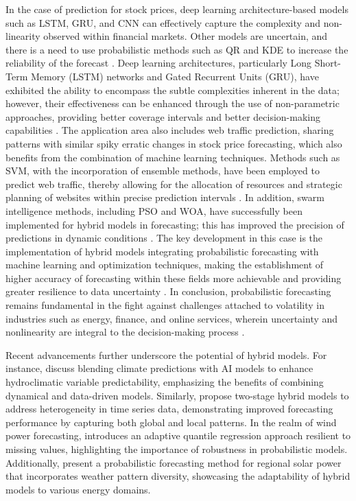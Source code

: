 In the case of prediction for stock prices, deep learning architecture-based models such as LSTM, GRU, and CNN can effectively capture the complexity and non-linearity observed within financial markets. Other models are uncertain, and there is a need to use probabilistic methods such as QR and KDE to increase the reliability of the forecast \cite{4, 9}. Deep learning architectures, particularly Long Short-Term Memory (LSTM) networks and Gated Recurrent Units (GRU), have exhibited the ability to encompass the subtle complexities inherent in the data; however, their effectiveness can be enhanced through the use of non-parametric approaches, providing better coverage intervals and better decision-making capabilities \cite{8, 3}. The application area also includes web traffic prediction, sharing patterns with similar spiky erratic changes in stock price forecasting, which also benefits from the combination of machine learning techniques. Methods such as SVM, with the incorporation of ensemble methods, have been employed to predict web traffic, thereby allowing for the allocation of resources and strategic planning of websites within precise prediction intervals \cite{5, 7}. In addition, swarm intelligence methods, including PSO and WOA, have successfully been implemented for hybrid models in forecasting; this has improved the precision of predictions in dynamic conditions \cite{9}. The key development in this case is the implementation of hybrid models integrating probabilistic forecasting with machine learning and optimization techniques, making the establishment of higher accuracy of forecasting within these fields more achievable and providing greater resilience to data uncertainty \cite{1, 6}. In conclusion, probabilistic forecasting remains fundamental in the fight against challenges attached to volatility in industries such as energy, finance, and online services, wherein uncertainty and nonlinearity are integral to the decision-making process \cite{2, 10, 9}.

Recent advancements further underscore the potential of hybrid models. For instance, \cite{14} discuss blending climate predictions with AI models to enhance hydroclimatic variable predictability, emphasizing the benefits of combining dynamical and data-driven models. Similarly, \cite{15} propose two-stage hybrid models to address heterogeneity in time series data, demonstrating improved forecasting performance by capturing both global and local patterns. In the realm of wind power forecasting, \cite{16} introduces an adaptive quantile regression approach resilient to missing values, highlighting the importance of robustness in probabilistic models. Additionally, \cite{17} present a probabilistic forecasting method for regional solar power that incorporates weather pattern diversity, showcasing the adaptability of hybrid models to various energy domains.

